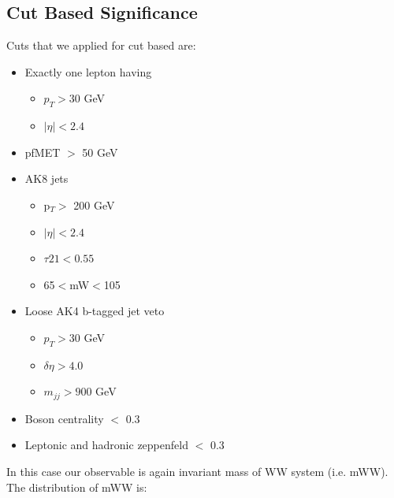 \subsection{Cut Based Significance}
Cuts that we applied for cut based are:
\begin{itemize}
	\item Exactly one lepton having
	\begin{itemize}
		\item $p_T > 30$ GeV
		\item $|\eta| < 2.4$
	\end{itemize}
	\item pfMET $>$ 50 GeV
	\item AK8 jets
	\begin{itemize}
		\item  p$_T >$ 200 GeV
		\item $|\eta|<2.4$
		\item $\tau 21 < 0.55$
		\item 65$<$mW$<$105
	\end{itemize}
	\item Loose AK4 b-tagged jet veto
	\begin{itemize}
		\item $p_T>30$ GeV
		\item $\delta \eta > 4.0$
		\item $m_{jj}>900$ GeV
	\end{itemize}
	\item Boson centrality $<$ 0.3
	\item Leptonic and hadronic zeppenfeld $<$ 0.3
\end{itemize}

In this case our observable is again invariant mass of WW system (i.e. mWW). The distribution of mWW is:

